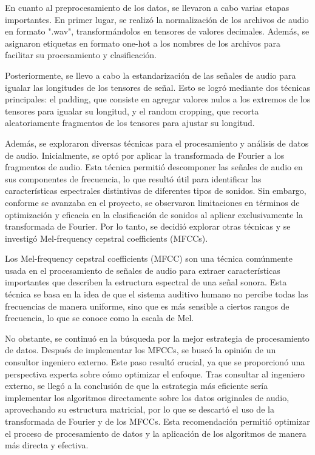 En cuanto al preprocesamiento de los datos, se llevaron a cabo varias etapas importantes. En primer lugar, se realizó la normalización de los archivos de audio en formato ".wav", transformándolos en tensores de valores decimales. Además, se asignaron etiquetas en formato one-hot a los nombres de los archivos para facilitar su procesamiento y clasificación.

Posteriormente, se llevo a cabo la estandarización de las señales de audio para igualar las longitudes de los tensores de señal. Esto se logró mediante dos técnicas principales: el padding, que consiste en agregar valores nulos a los extremos de los tensores para igualar su longitud, y el random cropping, que recorta aleatoriamente fragmentos de los tensores para ajustar su longitud.

Además, se exploraron diversas técnicas para el procesamiento y análisis de datos de audio. Inicialmente, se optó por aplicar la transformada de Fourier a los fragmentos de audio. Esta técnica permitió descomponer las señales de audio en sus componentes de frecuencia, lo que resultó útil para identificar las características espectrales distintivas de diferentes tipos de sonidos. Sin embargo, conforme se avanzaba en el proyecto, se observaron limitaciones en términos de optimización y eficacia en la clasificación de sonidos al aplicar exclusivamente la transformada de Fourier. Por lo tanto, se decidió explorar otras técnicas y se investigó Mel-frequency cepstral coefficients (MFCCs).

Los Mel-frequency cepstral coefficients (MFCC) son una técnica comúnmente usada en el procesamiento de señales de audio para extraer características importantes que describen la estructura espectral de una señal sonora. Esta técnica se basa en la idea de que el sistema auditivo humano no percibe todas las frecuencias de manera uniforme, sino que es más sensible a ciertos rangos de frecuencia, lo que se conoce como la escala de Mel.

No obstante, se continuó en la búsqueda por la mejor estrategia de procesamiento de datos. Después de implementar los MFCCs, se buscó la opinión de un consultor ingeniero externo. Este paso resultó crucial, ya que se proporcionó una perspectiva experta sobre cómo optimizar el enfoque. Tras consultar al ingeniero externo, se llegó a la conclusión de que la estrategia más eficiente sería implementar los algoritmos directamente sobre los datos originales de audio, aprovechando su estructura matricial, por lo que se descartó el uso de la transformada de Fourier y de los MFCCs. Esta recomendación permitió optimizar el proceso de procesamiento de datos y la aplicación de los algoritmos de manera más directa y efectiva.

